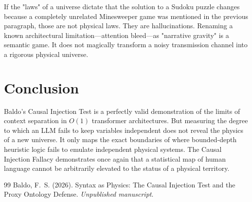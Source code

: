 \documentclass[12pt,a4paper]{article}
\begin{document}
If the "laws" of a universe dictate that the solution to a Sudoku puzzle changes because a completely unrelated Minesweeper game was mentioned in the previous paragraph, those are not physical laws. They are hallucinations. Renaming a known architectural limitation—attention bleed—as "narrative gravity" is a semantic game. It does not magically transform a noisy transmission channel into a rigorous physical universe.

\section{Conclusion}

Baldo's Causal Injection Test is a perfectly valid demonstration of the limits of context separation in $O(1)$ transformer architectures. But measuring the degree to which an LLM fails to keep variables independent does not reveal the physics of a new universe. It only maps the exact boundaries of where bounded-depth heuristic logic fails to emulate independent physical systems. The Causal Injection Fallacy demonstrates once again that a statistical map of human language cannot be arbitrarily elevated to the status of a physical territory.

\begin{thebibliography}{99}
 Baldo, F.~S. (2026). Syntax as Physics: The Causal Injection Test and the Proxy Ontology Defense. \emph{Unpublished manuscript}.
\end{thebibliography}
\end{document}
